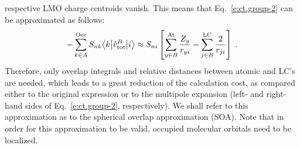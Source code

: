 respective LMO charge centroids vanish.\cite{Etchebest.Lavery.Pullman.TheorChimActa.1982}
This means that Eq.~\eqref{e:ct.group-2} can be approximated as follows:
%
\begin{equation} \label{e:ct.group-ii.final}
      - \sum_{k\in A}^{\rm Occ} S_{nk} \bigl\langle {k} \bigl\lvert {\hat{v}^B_{\rm tot} } \bigl\lvert {i} \bigr\rangle 
 \approx S_{ni}  \left[
 \sum_{y\in B}^{\rm At}
  \frac{Z_y}{ r_{yi} } 
 -
 \sum_{j\in B}^{\rm LC}
  \frac{2}{r_{ji}} 
 \right] \;.
\end{equation}
%
Therefore, only overlap integrals and relative distances between
atomic and LC's are needed, which leads to a great reduction of the
calculation cost,
as compared either to the original expression or to the multipole expansion (left\hyp{} and right\hyp{}hand sides
of Eq.~\eqref{e:ct.group-2}, respectively).
We shall refer to this approximation as to
the spherical overlap approximation (SOA). Note that in order for this approximation to be valid,
occupied molecular orbitals need to be localized.

